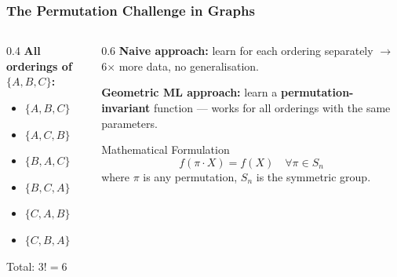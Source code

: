 \begin{frame}[fragile]\frametitle{The Permutation Challenge in Graphs}

\begin{columns}
\begin{column}{0.4\textwidth}
\textbf{All orderings of $\{A,B,C\}$:}
\begin{itemize}
  \item $\{A, B, C\}$
  \item $\{A, C, B\}$
  \item $\{B, A, C\}$
  \item $\{B, C, A\}$
  \item $\{C, A, B\}$
  \item $\{C, B, A\}$
\end{itemize}
Total: $3! = 6$
\end{column}
\begin{column}{0.6\textwidth}
\textbf{Naive approach:} learn for each ordering separately $\rightarrow$ 6$\times$ more data, no generalisation.

\vspace{0.3cm}
\textbf{Geometric ML approach:} learn a \textbf{permutation-invariant} function --- works for all orderings with the same parameters.

\begin{block}{Mathematical Formulation}
$$f(\pi \cdot X) = f(X) \quad \forall \pi \in S_n$$
where $\pi$ is any permutation, $S_n$ is the symmetric group.
\end{block}
\end{column}
\end{columns}

\end{frame}

